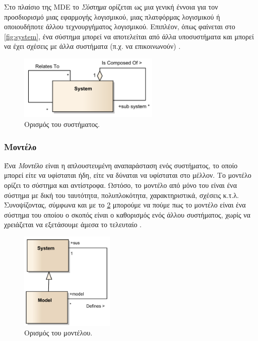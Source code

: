 Στο πλαίσιο της MDE το \textit{Σύστημα} ορίζεται ως μια γενική έννοια για τον προσδιορισμό μιας εφαρμογής λογισμικού, μιας πλατφόρμας λογισμικού ή οποιουδήποτε άλλου τεχνουργήματος λογισμικού. Επιπλέον, όπως φαίνεται στο \autoref{fig:system}, ένα σύστημα μπορεί να αποτελείται από άλλα υποσυστήματα και μπορεί να έχει σχέσεις με άλλα συστήματα (π.χ. να επικοινωνούν) \cite{bib:rodrigues_2015}.

\begin{figure}[!ht]
	\centering
	\includegraphics[width=0.6\textwidth]{./images/chapter2/system.png}
	\caption{Ορισμός του συστήματος.}
	\label{fig:system}
\end{figure}

\subsubsection{Μοντέλο}
\label{subsubsec:model}

Ένα \textit{Μοντέλο} είναι η απλουστευμένη αναπαράσταση ενός συστήματος, το οποίο μπορεί είτε να υφίσταται ήδη, είτε να δύναται να υφίσταται στο μέλλον. Το μοντέλο ορίζει το σύστημα και αντίστροφα. Ωστόσο, το μοντέλο από μόνο του είναι ένα σύστημα με δική του ταυτότητα, πολυπλοκότητα, χαρακτηριστικά, σχέσεις κ.τ.λ. Συνοψίζοντας, σύμφωνα και με το \ref{fig:model} μπορούμε να πούμε πως το μοντέλο είναι ένα σύστημα του οποίου ο σκοπός είναι ο καθορισμός ενός άλλου συστήματος, χωρίς να χρειάζεται να εξετάσουμε άμεσα το τελευταίο \cite{bib:rodrigues_2015}.

\begin{figure}[!ht]
	\centering
	\includegraphics[width=0.4\textwidth]{./images/chapter2/model.png}
	\caption{Ορισμός του μοντέλου.}
	\label{fig:model}
\end{figure}

